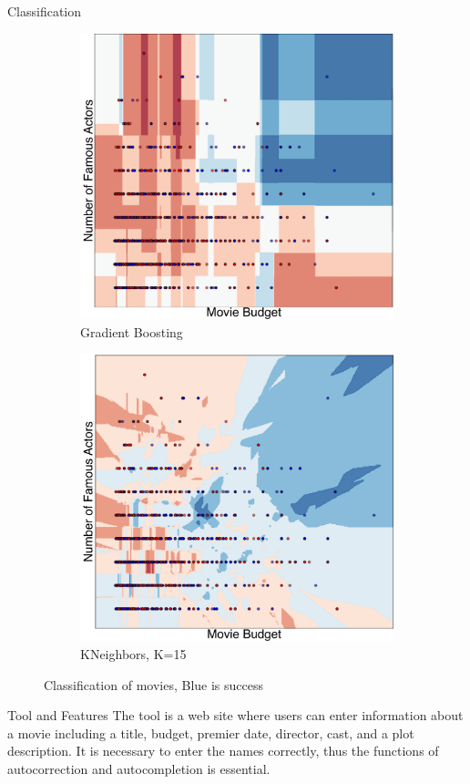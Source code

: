 \documentclass[final,table]{beamer}
\newlength{\twocolwid}
\begin{document}
\begin{frame}[t]
\begin{columns}[t]
\begin{column}{\twocolwid}
\begin{block}{Classification}
\begin{figure}
\begin{subfigure}[b]{0.2\textwidth}
\includegraphics[width=30ex]{gb2.pdf}
\caption{Gradient Boosting}
\end{subfigure} \hspace{20ex}
\begin{subfigure}[b]{0.2\textwidth}
 \includegraphics[width=30ex]{kn2.pdf}
 \caption{KNeighbors, K=15}
 \end{subfigure}
 \caption{Classification of movies, Blue is success}
\end{figure} 
\end{block}
\begin{block}{Tool and Features}
The tool is a web site where users can enter information about a movie including a title, budget, premier date, director, cast, and a plot description. It is necessary to enter the names correctly, thus the functions of autocorrection and autocompletion is essential.  


\end{block}
\end{column}
\end{columns}
\end{frame}
\end{document}
